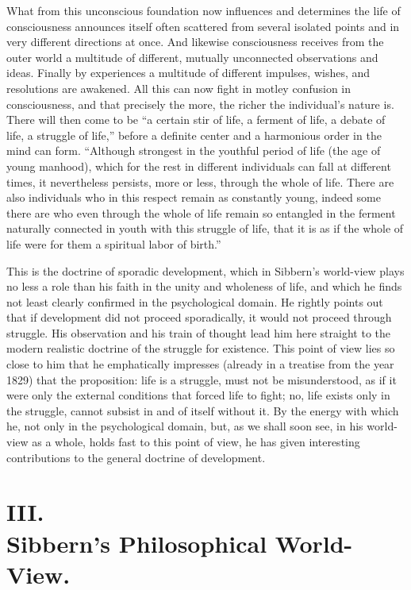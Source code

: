\documentclass[12pt,a4paper,openany]{book}
\newcommand{\opage}[1]{\marginnote{\footnotesize\textit{[#1]}}}
\begin{document}
What from this unconscious foundation now influences and
determines the life of consciousness announces itself often scattered from
several isolated points and in very different directions
at once. And likewise consciousness receives from the outer world
a multitude of different, mutually unconnected
observations and ideas. Finally by experiences
a multitude of different impulses, wishes, and resolutions are awakened. All
this can now fight in motley confusion in consciousness, and
that precisely the more, the richer the individual's nature is. There will then
come to be ``a certain stir of life, a ferment of life, a debate of life,
a struggle of life,'' before a definite center
and a harmonious order in the mind can form. ``Although strongest in the
youthful period of life (the age of young manhood), which for the rest in
different individuals can fall at different times,
it nevertheless persists, more or less, through the whole of life. There
are also individuals who in this respect remain as
constantly young, indeed some there are who even through the whole of life
remain so entangled in the ferment naturally connected in youth
with this struggle of life, that it is as if
the whole of life were for them a spiritual labor of birth.''

This is the doctrine of sporadic development, which in Sibbern's
world-view plays no less a role than his faith
in the unity and wholeness of life, and which he finds not least
clearly confirmed in the psychological domain. He rightly
points out that if development did not proceed
\opage{84}sporadically, it would not proceed through struggle. His
observation and his train of thought lead him here straight
to the modern realistic doctrine of the struggle for existence.
This point of view lies so close to him that he emphatically impresses
(already in a treatise from the year 1829) that the proposition:
life is a struggle, must not be misunderstood, as if it were only
the external conditions that forced life to fight; no,
life exists only in the struggle, cannot subsist in and of itself
without it. By the energy with which he, not only in the
psychological domain, but, as we shall soon see, in his
world-view as a whole, holds fast to this point of view,
he has given interesting contributions to the general doctrine of
development.

\section*{III.\\  Sibbern's Philosophical World-View.}
\end{document}
